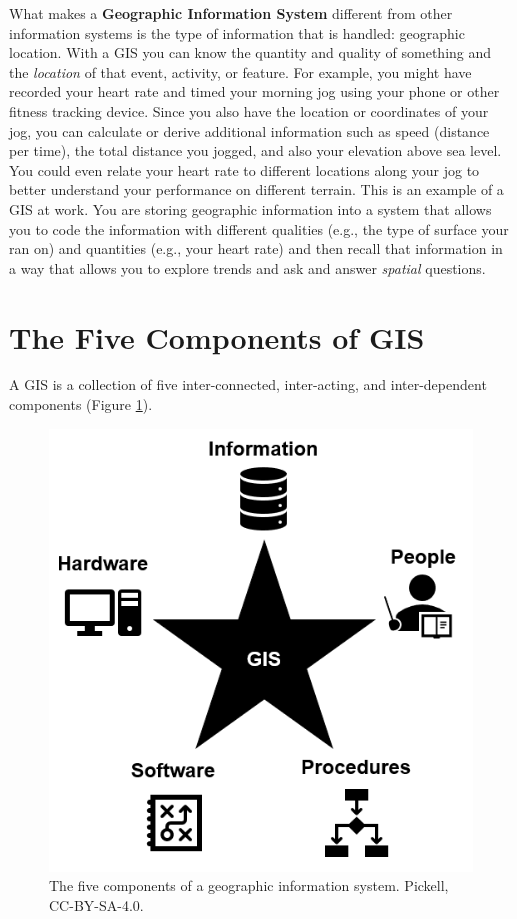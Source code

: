 \documentclass[
]{book}
\begin{document}
What makes a \textbf{Geographic Information System} different from other information systems is the type of information that is handled: geographic location. With a GIS you can know the quantity and quality of something and the \emph{location} of that event, activity, or feature. For example, you might have recorded your heart rate and timed your morning jog using your phone or other fitness tracking device. Since you also have the location or coordinates of your jog, you can calculate or derive additional information such as speed (distance per time), the total distance you jogged, and also your elevation above sea level. You could even relate your heart rate to different locations along your jog to better understand your performance on different terrain. This is an example of a GIS at work. You are storing geographic information into a system that allows you to code the information with different qualities (e.g., the type of surface your ran on) and quantities (e.g., your heart rate) and then recall that information in a way that allows you to explore trends and ask and answer \emph{spatial} questions.

\section{The Five Components of GIS}\label{the-five-components-of-gis}

A GIS is a collection of five inter-connected, inter-acting, and inter-dependent components (Figure \ref{fig:1-five-components-gis}).

\begin{figure}
\includegraphics[width=0.75\linewidth]{images/01-five-components-gis} \caption{The five components of a geographic information system. Pickell, CC-BY-SA-4.0.}\label{fig:1-five-components-gis}
\end{figure}
\end{document}
